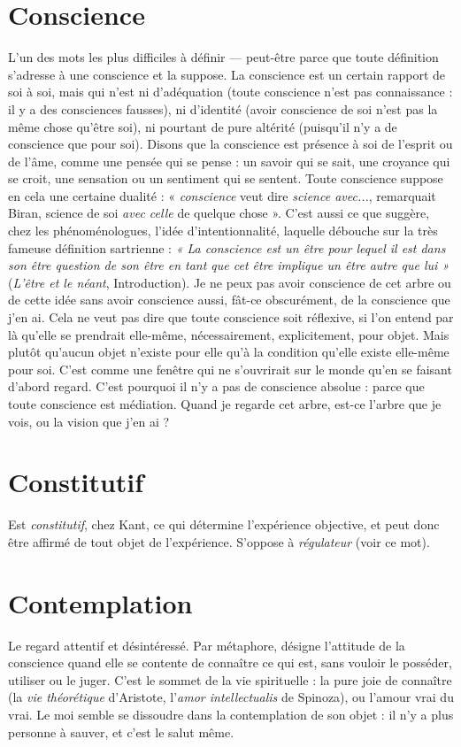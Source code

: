 \section{Conscience}
L’un des mots les plus difficiles à définir — peut-être parce
que toute définition s'adresse à une conscience et la suppose.
La conscience est un certain rapport de soi à soi, mais qui n’est ni d’adéquation
(toute conscience n’est pas connaissance : il y a des consciences fausses), ni
d'identité (avoir conscience de soi n’est pas la même chose qu'être soi), ni pourtant
de pure altérité (puisqu'il n’y a de conscience que pour soi). Disons que la
conscience est présence à soi de l'esprit ou de l’âme, comme une pensée qui se
pense : un savoir qui se sait, une croyance qui se croit, une sensation ou un sentiment
qui se sentent. Toute conscience suppose en cela une certaine dualité :
« {\it conscience} veut dire {\it science avec...}, remarquait Biran, science de soi {\it avec celle}
de quelque chose ». C’est aussi ce que suggère, chez les phénoménologues,
l’idée d’intentionnalité, laquelle débouche sur la très fameuse définition
sartrienne : {\it « La conscience est un être pour lequel il est dans son être question de
son être en tant que cet être implique un être autre que lui »} ({\it L'être et le néant},
Introduction). Je ne peux pas avoir conscience de cet arbre ou de cette idée sans
avoir conscience aussi, fât-ce obscurément, de la conscience que j’en ai. Cela ne
veut pas dire que toute conscience soit réflexive, si l’on entend par là qu’elle se
prendrait elle-même, nécessairement, explicitement, pour objet. Mais plutôt
qu'aucun objet n’existe pour elle qu’à la condition qu’elle existe elle-même
pour soi. C’est comme une fenêtre qui ne s’ouvrirait sur le monde qu’en se faisant
d’abord regard. C’est pourquoi il n’y a pas de conscience absolue : parce
que toute conscience est médiation. Quand je regarde cet arbre, est-ce l’arbre
que je vois, ou la vision que j’en ai ?

\section{Constitutif}
Est {\it constitutif}, chez Kant, ce qui détermine l’expérience
objective, et peut donc être affirmé de tout objet de l’expérience.
S’oppose à {\it régulateur} (voir ce mot).

\section{Contemplation}
Le regard attentif et désintéressé. Par métaphore, désigne
l'attitude de la conscience quand elle se contente de
connaître ce qui est, sans vouloir le posséder, utiliser ou le juger. C’est le
sommet de la vie spirituelle : la pure joie de connaître (la {\it vie théorétique} d’Aristote,
l’{\it amor intellectualis} de Spinoza), ou l'amour vrai du vrai. Le moi semble se
dissoudre dans la contemplation de son objet : il n’y a plus personne à sauver,
et c’est le salut même.

